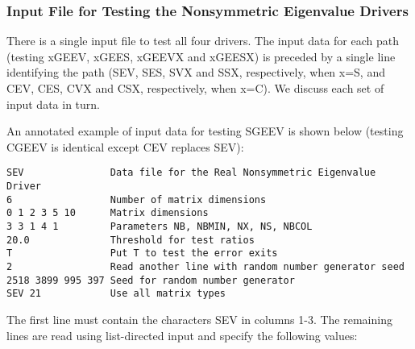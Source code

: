 \subsubsection{Input File for Testing the Nonsymmetric Eigenvalue
Drivers}

\dent
There is a single input file to test all four drivers. The input data
for
each path (testing xGEEV, xGEES, xGEEVX and xGEESX) is preceded by a
single
line identifying the path (SEV, SES, SVX and SSX, respectively, when
x=S,
and CEV, CES, CVX and CSX, respectively, when x=C). We discuss
each set of input data in turn.

An annotated example of input data for testing SGEEV is shown below
(testing CGEEV is identical except CEV replaces SEV):

\begin{verbatim}
SEV               Data file for the Real Nonsymmetric Eigenvalue Driver
6                 Number of matrix dimensions
0 1 2 3 5 10      Matrix dimensions
3 3 1 4 1         Parameters NB, NBMIN, NX, NS, NBCOL
20.0              Threshold for test ratios
T                 Put T to test the error exits
2                 Read another line with random number generator seed
2518 3899 995 397 Seed for random number generator
SEV 21            Use all matrix types
\end{verbatim}

The first line must contain the characters SEV in columns 1-3. The
remaining
lines are read using list-directed input and specify the following
values:

